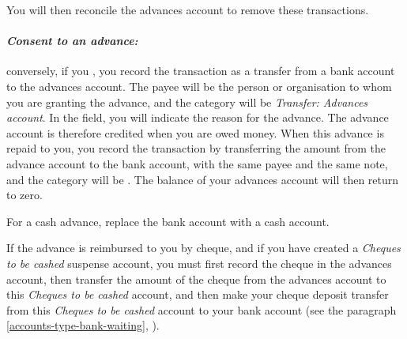 You will then reconcile the advances account to remove these transactions.

\paragraph{\textsl{Consent to an advance:}} conversely, if you , you record the transaction as a transfer from a bank account to the advances account. The payee will be the person or organisation to whom you are granting the advance, and the category will be \emph{Transfer: Advances account}. In the  field, you will indicate the reason for the advance. The advance account is therefore credited when you are owed money. When this advance is repaid to you, you record the transaction by transferring the amount from the advance account to the bank account, with the same payee and the same note, and the category will be . The balance of your advances account will then return to zero. 

For a cash advance, replace the bank account with a cash account.

If the advance is reimbursed to you by cheque, and if you have created a \emph{Cheques to be cashed} suspense account, you must first record the cheque in the advances account, then transfer the amount of the cheque from the advances account to this \emph{Cheques to be cashed} account, and then make your cheque deposit transfer from this \emph{Cheques to be cashed} account to your bank account (see the paragraph \vref{accounts-type-bank-waiting}, ).

